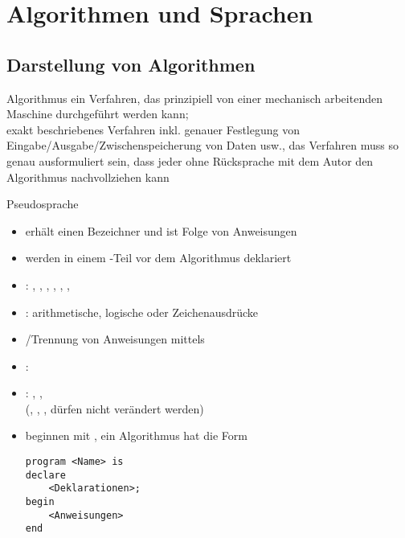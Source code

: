 \section{%
    Algorithmen und Sprachen%
}

\subsection{%
    Darstellung von Algorithmen%
}

\begin{Def}{Algorithmus}
    ein Verfahren, das prinzipiell von einer mechanisch arbeitenden
    Maschine durchgeführt werden kann; \\
    exakt beschriebenes Verfahren inkl. genauer Festlegung von
    Eingabe/Ausgabe/Zwischen\-spei\-cherung von Daten usw., das Verfahren
    muss so genau ausformuliert sein, dass jeder ohne Rücksprache mit dem
    Autor den Algorithmus nachvollziehen kann
\end{Def}

\begin{Def}{Pseudosprache}
    \begin{itemize}
        \item {} erhält einen Bezeichner und ist Folge von
        Anweisungen

        \item {} werden in einem -Teil vor
        dem Algorithmus deklariert

        \item {}: , \quad
        , \quad
        , \quad {}, \quad
        , \quad
        , \quad

        \item {}: arithmetische, logische oder
        Zeichenausdrücke

        \item {}/Trennung von Anweisungen
        mittels \pseudocode{;}

        \item {}:

        \item {}: , \quad
        , \\
         \quad
        (, , , 
        dürfen nicht verändert werden)

        \item {} beginnen mit \pseudocode{{-}{-}}, ein
        Algorithmus hat die Form

\begin{lstlisting}[language=pseudosprache]
program <Name> is
declare
    <Deklarationen>;
begin
    <Anweisungen>
end
\end{lstlisting}
    \end{itemize}
\end{Def}

